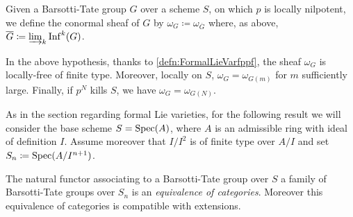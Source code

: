 \begin{defn}
	Given a Barsotti-Tate group $G$ over a scheme $S$, on which $p$ is locally nilpotent,
	we define the conormal sheaf of $G$ by $\omega_G \coloneqq \omega_{\overline{G}}$
	where, as above, $\overline{G} \coloneqq \varinjlim_k \mathrm{Inf}^k(G)$.
\end{defn}


\begin{rem}\label{rem:ConormalSheafBT}
	In the above hypothesis,
	thanks to \cref{defn:FormalLieVarfppf}, 
	the sheaf $\omega_G$ is
	locally-free of finite type.
	Moreover, locally on $S$, $\omega_G = \omega_{G(m)}$ for
	$m$ sufficiently large.
	Finally, if $p^N$ kills $S$, we have $\omega_G = \omega_{G(N)}$.
\end{rem}


\noindent
As in the section regarding formal Lie varieties,
for the following result we will consider the base scheme \(S = \operatorname{Spec}(A)\),
where \(A\) is an admissible ring with ideal of definition \(I\).
Assume moreover that \(I/I^2\) is of finite type over \(A/I\) and
set \(S_n \coloneqq \operatorname{Spec}(A/I^{ n+1 })\).
\begin{lem}\label{lem:BT/admissible}
	The natural functor associating to a Barsotti-Tate group over \(S\)
	a family of Barsotti-Tate groups over \(S_n\) is an
	\emph{equivalence of categories}.
	Moreover this equivalence of categories is compatible
	with extensions.
\end{lem}


